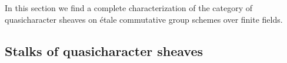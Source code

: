 \documentclass[CM,Submssn,SecEq]{degruyter-crelle} %
\theoremstyle{plain}
\theoremstyle{definition}
\theoremstyle{remark}
\newcommand{\bFq}{\bar{k}}
\newcommand{\Fq}{k}
\DeclareMathOperator{\Gal}{Gal}
\begin{document}


In this section we find a complete characterization of the category of quasicharacter sheaves on \'etale commutative group schemes over finite fields.

\subsection{Stalks of quasicharacter sheaves}\label{ssec:stalks}
\end{document}
